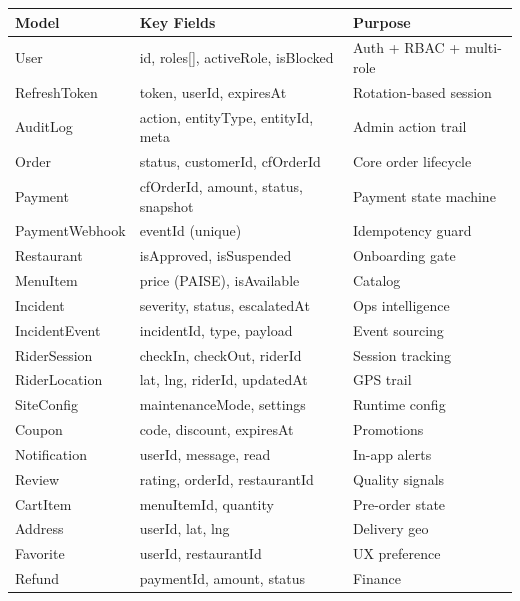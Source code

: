 \documentclass[11pt,a4paper]{article}
\begin{document}
\begin{tabularx}{\textwidth}{@{}llX@{}}
\toprule
\rowcolor{navyblue}
\color{white}\bfseries Model & \color{white}\bfseries Key Fields & \color{white}\bfseries Purpose \\
\midrule
User & id, roles[], activeRole, isBlocked & Auth + RBAC + multi-role \\
\rowcolor{rowalt}
RefreshToken & token, userId, expiresAt & Rotation-based session \\
AuditLog & action, entityType, entityId, meta & Admin action trail \\
\rowcolor{rowalt}
Order & status, customerId, cfOrderId & Core order lifecycle \\
Payment & cfOrderId, amount, status, snapshot & Payment state machine \\
\rowcolor{rowalt}
PaymentWebhook & eventId (unique) & Idempotency guard \\
Restaurant & isApproved, isSuspended & Onboarding gate \\
\rowcolor{rowalt}
MenuItem & price (PAISE), isAvailable & Catalog \\
Incident & severity, status, escalatedAt & Ops intelligence \\
\rowcolor{rowalt}
IncidentEvent & incidentId, type, payload & Event sourcing \\
RiderSession & checkIn, checkOut, riderId & Session tracking \\
\rowcolor{rowalt}
RiderLocation & lat, lng, riderId, updatedAt & GPS trail \\
SiteConfig & maintenanceMode, settings & Runtime config \\
\rowcolor{rowalt}
Coupon & code, discount, expiresAt & Promotions \\
Notification & userId, message, read & In-app alerts \\
\rowcolor{rowalt}
Review & rating, orderId, restaurantId & Quality signals \\
CartItem & menuItemId, quantity & Pre-order state \\
\rowcolor{rowalt}
Address & userId, lat, lng & Delivery geo \\
Favorite & userId, restaurantId & UX preference \\
\rowcolor{rowalt}
Refund & paymentId, amount, status & Finance \\
\bottomrule
\end{tabularx}

\end{document}
